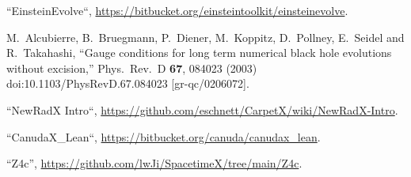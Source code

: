 \begin{thebibliography}{9}

 ``EinsteinEvolve``,
  \url{https://bitbucket.org/einsteintoolkit/einsteinevolve}.

  M.~Alcubierre, B.~Bruegmann, P.~Diener, M.~Koppitz, D.~Pollney, E.~Seidel and R.~Takahashi,
  ``Gauge conditions for long term numerical black hole evolutions without excision,''
  Phys.\ Rev.\ D {\bf 67}, 084023 (2003)
  doi:10.1103/PhysRevD.67.084023
  [gr-qc/0206072].

 ``NewRadX Intro``,
  \url{https://github.com/eschnett/CarpetX/wiki/NewRadX-Intro}.

 ``CanudaX\_Lean``,
  \url{https://bitbucket.org/canuda/canudax_lean}.

 ``Z4c'',
  \url{https://github.com/lwJi/SpacetimeX/tree/main/Z4c}.

\end{thebibliography}



